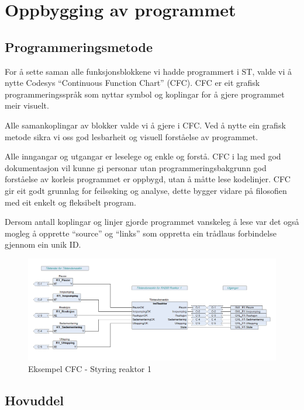 \newpage
\section{Oppbygging av programmet}
\thispagestyle{fancy}

\subsection{Programmeringsmetode}
For å sette saman alle funksjonsblokkene vi hadde programmert i \gls{ST}, valde vi å nytte \gls{Codesys} ``Continuous Function Chart'' (\gls{CFC}).
\gls{CFC} er eit grafisk programmeringsspråk som nyttar symbol og koplingar for å gjere programmet meir visuelt.

Alle samankoplingar av blokker valde vi å gjere i \gls{CFC}. Ved å nytte ein grafisk metode sikra vi oss god lesbarheit og
visuell forståelse av programmet. 

Alle inngangar og utgangar er leselege og enkle og forstå. \gls{CFC} i lag med god dokumentasjon vil kunne gi personar utan programmeringsbakgrunn
god forståelse av korleis programmet er oppbygd, utan å måtte lese kodelinjer.
\gls{CFC} gir eit godt grunnlag for feilsøking og analyse, dette bygger vidare på filosofien med eit enkelt og fleksibelt program.

Dersom antall koplingar og linjer gjorde programmet vanskeleg å lese var det også
mogleg å opprette ``source'' og ``links'' som oppretta ein trådlaus forbindelse gjennom ein unik ID.

\begin{figure}[htbp]
    \centering
    \includegraphics[width=1\textwidth]{Bilder/ReaktorPRG.png}
    \caption{Eksempel \gls{CFC} - Styring reaktor 1}\label{fig:CFCReaktor}
\end{figure}

\newpage

\subsection{Hovuddel}

